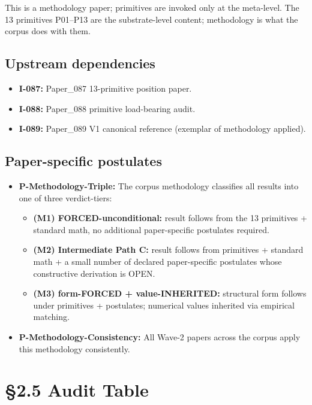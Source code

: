 \documentclass[11pt,a4paper]{article}
\begin{document}
This is a methodology paper; primitives are invoked only at the meta-level. The 13 primitives P01--P13 are the substrate-level content; methodology is what the corpus does with them.

\subsection{Upstream dependencies}

\begin{itemize}[noitemsep]
\item \textbf{I-087:} Paper\_087 13-primitive position paper.
\item \textbf{I-088:} Paper\_088 primitive load-bearing audit.
\item \textbf{I-089:} Paper\_089 V1 canonical reference (exemplar of methodology applied).
\end{itemize}

\subsection{Paper-specific postulates}

\begin{itemize}[noitemsep]
\item \textbf{P-Methodology-Triple:} The corpus methodology classifies all results into one of three verdict-tiers:
\begin{itemize}[noitemsep]
\item \textbf{(M1) FORCED-unconditional:} result follows from the 13 primitives + standard math, no additional paper-specific postulates required.
\item \textbf{(M2) Intermediate Path C:} result follows from primitives + standard math + a small number of declared paper-specific postulates whose constructive derivation is OPEN.
\item \textbf{(M3) form-FORCED + value-INHERITED:} structural form follows under primitives + postulates; numerical values inherited via empirical matching.
\end{itemize}
\item \textbf{P-Methodology-Consistency:} All Wave-2 papers across the corpus apply this methodology consistently.
\end{itemize}

\section*{\S2.5 Audit Table}
\end{document}
